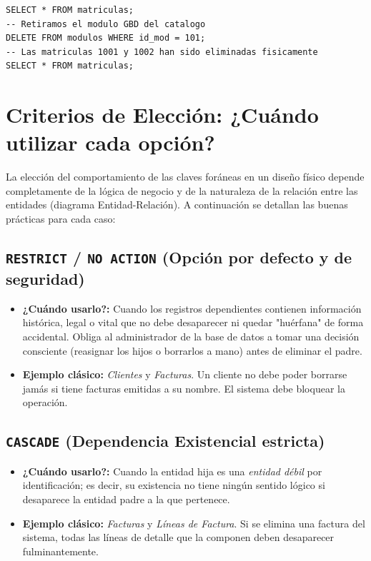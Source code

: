 \documentclass[12pt,a4paper]{article}
\begin{document}
\begin{lstlisting}
SELECT * FROM matriculas;
-- Retiramos el modulo GBD del catalogo
DELETE FROM modulos WHERE id_mod = 101;
-- Las matriculas 1001 y 1002 han sido eliminadas fisicamente
SELECT * FROM matriculas;
\end{lstlisting}

\section{Criterios de Elección: ¿Cuándo utilizar cada opción?}

La elección del comportamiento de las claves foráneas en un diseño físico depende completamente de la lógica de negocio y de la naturaleza de la relación entre las entidades (diagrama Entidad-Relación). A continuación se detallan las buenas prácticas para cada caso:

\subsection{\texttt{RESTRICT} / \texttt{NO ACTION} (Opción por defecto y de seguridad)}
\begin{itemize}
    \item \textbf{¿Cuándo usarlo?:} Cuando los registros dependientes contienen información histórica, legal o vital que no debe desaparecer ni quedar "huérfana" de forma accidental. Obliga al administrador de la base de datos a tomar una decisión consciente (reasignar los hijos o borrarlos a mano) antes de eliminar el padre.
    \item \textbf{Ejemplo clásico:} \textit{Clientes} y \textit{Facturas}. Un cliente no debe poder borrarse jamás si tiene facturas emitidas a su nombre. El sistema debe bloquear la operación.
\end{itemize}

\subsection{\texttt{CASCADE} (Dependencia Existencial estricta)}
\begin{itemize}
    \item \textbf{¿Cuándo usarlo?:} Cuando la entidad hija es una \textit{entidad débil} por identificación; es decir, su existencia no tiene ningún sentido lógico si desaparece la entidad padre a la que pertenece.
    \item \textbf{Ejemplo clásico:} \textit{Facturas} y \textit{Líneas de Factura}. Si se elimina una factura del sistema, todas las líneas de detalle que la componen deben desaparecer fulminantemente.
\end{itemize}
\end{document}
